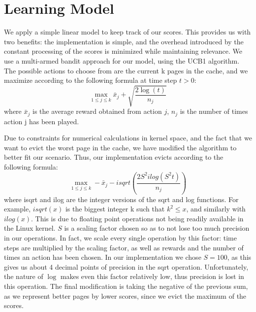 \section{Learning Model}

We apply a simple linear model to keep track of our scores. This provides us with two benefits: the implementation is simple, and the overhead introduced by the constant processing of the scores is minimized while maintaining relevance. We use a multi-armed bandit approach for our model, using the UCB1 algorithm. The possible actions to choose from are the current k pages in the cache, and we maximize according to the following formula at time step $t>0$: $$\max_{1 \leq j \leq k} \bar{x}_{j} + \sqrt{\frac{2\log(t)}{n_{j}}}$$  where $\bar{x}_{j}$ is the average reward obtained from action $j$, $n_{j}$ is the number of times action j has been played.

Due to constraints for numerical calculations in kernel space, and the fact that we want to evict the worst page in the cache, we have modified the algorithm to better fit our scenario. Thus, our implementation evicts according to the following formula:  $$\max_{1 \leq j \leq k} -\bar{x}_{j} - isqrt(\frac{2S^{2}ilog(S^{2}t)}{n_{j}})$$ where isqrt and ilog are the integer versions of the sqrt and log functions. For example, $isqrt(x)$ is the biggest integer k such that $k^{2}\leq x$, and similarly with $ilog(x)$. This is due to floating point operations not being readily available in the Linux kernel. $S$ is a scaling factor chosen so as to not lose too much precision in our operations. In fact, we scale every single operation by this factor: time steps are multiplied by the scaling factor, as well as rewards and the number of times an action has been chosen. In our implementation we chose $S=100$, as this gives us about 4 decimal points of precision in the sqrt operation. Unfortunately, the nature of $\log$ makes even this factor relatively low, thus precision is lost in this operation. The final modification is taking the negative of the previous sum, as we represent better pages by lower scores, since we evict the maximum of the scores.